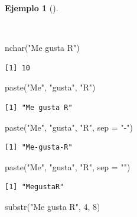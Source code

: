 \documentclass[
  spanish,
  a4paper,
]{scrreport}
\newenvironment{Shaded}{\begin{snugshade}}{\end{snugshade}}
\newcommand{\AttributeTok}[1]{\textcolor[rgb]{0.40,0.45,0.13}{#1}}
\newcommand{\DecValTok}[1]{\textcolor[rgb]{0.68,0.00,0.00}{#1}}
\newcommand{\FunctionTok}[1]{\textcolor[rgb]{0.28,0.35,0.67}{#1}}
\newcommand{\NormalTok}[1]{\textcolor[rgb]{0.00,0.23,0.31}{#1}}
\newcommand{\StringTok}[1]{\textcolor[rgb]{0.13,0.47,0.30}{#1}}
\theoremstyle{definition}
\theoremstyle{definition}
\newtheorem{example}{Ejemplo}[chapter]
\theoremstyle{remark}
\begin{document}
\begin{example}[]\protect\hypertarget{exm-operaciones-cadenas}{}\label{exm-operaciones-cadenas}

~

\begin{Shaded}
\begin{Highlighting}[]
\FunctionTok{nchar}\NormalTok{(}\StringTok{"Me gusta R"}\NormalTok{)}
\end{Highlighting}
\end{Shaded}

\begin{verbatim}
[1] 10
\end{verbatim}

\begin{Shaded}
\begin{Highlighting}[]
\FunctionTok{paste}\NormalTok{(}\StringTok{"Me"}\NormalTok{, }\StringTok{"gusta"}\NormalTok{, }\StringTok{"R"}\NormalTok{)}
\end{Highlighting}
\end{Shaded}

\begin{verbatim}
[1] "Me gusta R"
\end{verbatim}

\begin{Shaded}
\begin{Highlighting}[]
\FunctionTok{paste}\NormalTok{(}\StringTok{"Me"}\NormalTok{, }\StringTok{"gusta"}\NormalTok{, }\StringTok{"R"}\NormalTok{, }\AttributeTok{sep =} \StringTok{"{-}"}\NormalTok{)}
\end{Highlighting}
\end{Shaded}

\begin{verbatim}
[1] "Me-gusta-R"
\end{verbatim}

\begin{Shaded}
\begin{Highlighting}[]
\FunctionTok{paste}\NormalTok{(}\StringTok{"Me"}\NormalTok{, }\StringTok{"gusta"}\NormalTok{, }\StringTok{"R"}\NormalTok{, }\AttributeTok{sep =} \StringTok{""}\NormalTok{)}
\end{Highlighting}
\end{Shaded}

\begin{verbatim}
[1] "MegustaR"
\end{verbatim}

\begin{Shaded}
\begin{Highlighting}[]
\FunctionTok{substr}\NormalTok{(}\StringTok{"Me gusta R"}\NormalTok{, }\DecValTok{4}\NormalTok{, }\DecValTok{8}\NormalTok{)}
\end{Highlighting}
\end{Shaded}


\end{example}
\end{document}
